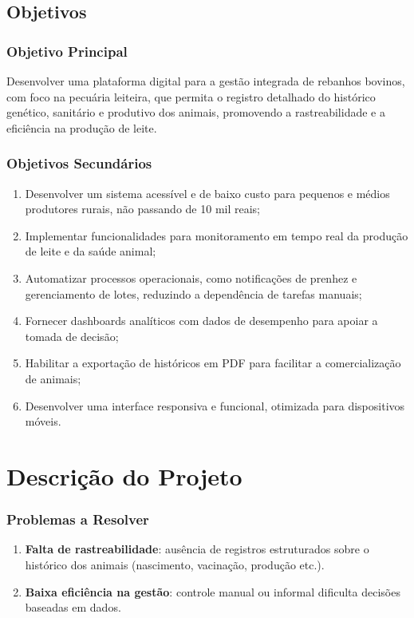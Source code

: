 \documentclass[12pt, a4paper]{article}
\begin{document}
\subsection{Objetivos}
\begin{spacing}{1.5}
\subsubsection{Objetivo Principal}
Desenvolver uma plataforma digital para a gestão integrada de rebanhos bovinos, com foco na pecuária leiteira, que permita o registro detalhado do histórico genético, sanitário e produtivo dos animais, promovendo a rastreabilidade e a eficiência na produção de leite.

\subsubsection{Objetivos Secundários}
\begin{enumerate}[label=\alph*)]
    \item Desenvolver um sistema acessível e de baixo custo para pequenos e médios produtores rurais, não passando de 10 mil reais;
    \item Implementar funcionalidades para monitoramento em tempo real da produção de leite e da saúde animal;
    \item Automatizar processos operacionais, como notificações de prenhez e gerenciamento de lotes, reduzindo a dependência de tarefas manuais;
    \item Fornecer dashboards analíticos com dados de desempenho para apoiar a tomada de decisão;
    \item Habilitar a exportação de históricos em PDF para facilitar a comercialização de animais;
    \item Desenvolver uma interface responsiva e funcional, otimizada para dispositivos móveis.
\end{enumerate}

\section{Descrição do Projeto}

\subsubsection{Problemas a Resolver}
\begin{enumerate}[label=\alph*)]
    \item \textbf{Falta de rastreabilidade}: ausência de registros estruturados sobre o histórico dos animais (nascimento, vacinação, produção etc.).
    \item \textbf{Baixa eficiência na gestão}: controle manual ou informal dificulta decisões baseadas em dados.
\end{enumerate}


\end{spacing}
\end{document}
